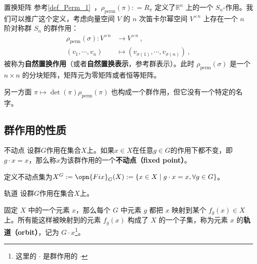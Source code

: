 \begin{example}{置换矩阵}\label{ex_Group3_6}
参考\autoref{def_Perm_1}~，$\rho_\text{perm}(\pi): = R_\pi$ 定义了$\mathbb{R}^n$ 上的一个 $S_n$-作用。我们可以推广这个定义，考虑向量空间 $V$ 的 $n$ 次笛卡尔幂空间 $V^{\times n}$ 上存在一个 $n$ 阶对称群 $S_n$ 的群作用：
\begin{equation}
\begin{aligned}
\rho_\text{perm}(\sigma): V^{\times n} &\to V^{\times n}~, \\
(v_1, \cdots, v_n) &\mapsto (v_{\sigma(1)}, \cdots, v_{\sigma(n)})~,
\end{aligned}
\end{equation}
被称为\textbf{自然置换作用}（或者\textbf{自然置换表示}，参考群表示）。此时 $\rho_\text{perm}(\sigma)$ 是一个 $n \times n$ 的分块矩阵，矩阵元为零矩阵或者恒等矩阵。

另一方面 $\pi \mapsto\det(\pi) \rho_\text{perm}(\pi)$ 也构成一个群作用，但它没有一个特定的名字。
\end{example}


\subsection{群作用的性质}


\begin{definition}{不动点}\label{def_Group3_2}
设群$G$作用在集合$X$上。如果$x\in X$在任意$g\in G$的作用下都不变，即$g\cdot x=x$，那么称$x$为该群作用的一个\textbf{不动点（fixed point）}。

定义不动点集为$X^G: = \opn{Fix}_G(X): = \{x\in X\mid g\cdot x=x, \forall g\in G\}$。
\end{definition}




\begin{definition}{轨道}
设群$G$作用在集合$X$上。

固定 $X$ 中的一个元素 $x$，那么每个 $G$ 中元素 $g$ 都把 $x$ 映射到某个 $f_g(x)\in X$ 上。所有能这样被映射到的元素 $f_g(x)$ 构成了 $X$ 的一个子集，称为元素 $x$ 的\textbf{轨道（orbit）}，记为 $G \cdot x$\footnote{这里的 $\cdot$ 是群作用的 $\cdot$ }。
\end{definition}









